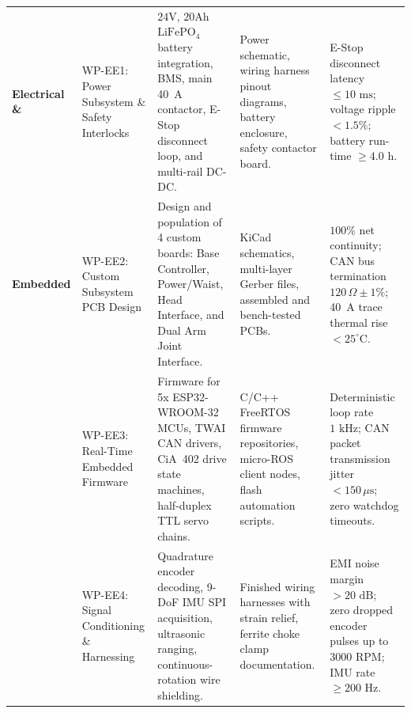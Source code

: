 \begin{small}
\begin{longtable}{@{}p{} p{} p{} p{} p{}@{}}
\textbf{Electrical \&} & 
WP-EE1: Power Subsystem \& Safety Interlocks & 
$24\text{V}$, $20\text{Ah}$ $\text{LiFePO}_4$ battery integration, BMS, main 40~A contactor, E-Stop disconnect loop, and multi-rail DC-DC. & 
Power schematic, wiring harness pinout diagrams, battery enclosure, safety contactor board. & 
E-Stop disconnect latency $\le 10\text{ ms}$; voltage ripple $<1.5\%$; battery run-time $\ge 4.0\text{ h}$. \\
\addlinespace[3pt]
\textbf{Embedded} & 
WP-EE2: Custom Subsystem PCB Design & 
Design and population of 4 custom boards: Base Controller, Power/Waist, Head Interface, and Dual Arm Joint Interface. & 
KiCad schematics, multi-layer Gerber files, assembled and bench-tested PCBs. & 
$100\%$ net continuity; CAN bus termination $120\,\Omega \pm 1\%$; 40~A trace thermal rise $<25^\circ\text{C}$. \\
\addlinespace[3pt]
& 
WP-EE3: Real-Time Embedded Firmware & 
Firmware for 5x ESP32-WROOM-32 MCUs, TWAI CAN drivers, CiA~402 drive state machines, half-duplex TTL servo chains. & 
C/C++ FreeRTOS firmware repositories, micro-ROS client nodes, flash automation scripts. & 
Deterministic loop rate $1\text{ kHz}$; CAN packet transmission jitter $<150\,\mu\text{s}$; zero watchdog timeouts. \\
\addlinespace[3pt]
& 
WP-EE4: Signal Conditioning \& Harnessing & 
Quadrature encoder decoding, 9-DoF IMU SPI acquisition, ultrasonic ranging, continuous-rotation wire shielding. & 
Finished wiring harnesses with strain relief, ferrite choke clamp documentation. & 
EMI noise margin $>20\text{ dB}$; zero dropped encoder pulses up to $3000\text{ RPM}$; IMU rate $\ge 200\text{ Hz}$. \\
\midrule


\end{longtable}
\end{small}
